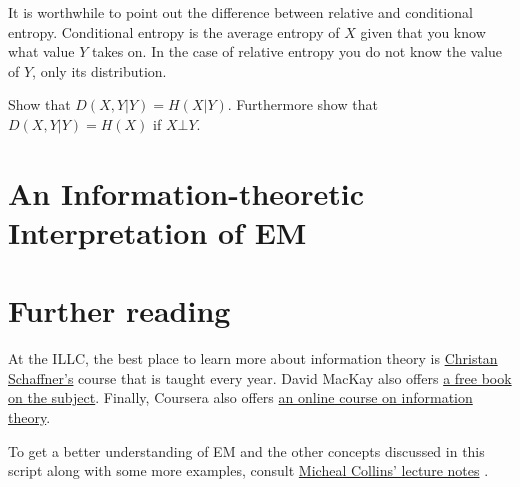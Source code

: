 It is worthwhile to point out the difference between relative and conditional entropy. Conditional entropy is the average entropy of $ X $ given that you
know what value $ Y $ takes on. In the case of relative entropy you do not know the value of $ Y $, only its distribution.

\begin{Exercise}
 Show that $ D(X,Y|Y) = H(X|Y) $. Furthermore show that $ D(X,Y|Y) = H(X) $ if $ X\bot Y $.
\end{Exercise}

\section{An Information-theoretic Interpretation of EM}

\section*{Further reading}

At the ILLC, the best place to learn more about information theory is \href{http://homepages.cwi.nl/~schaffne/courses/inftheory/2015/}{Christan Schaffner's}
course that is taught every year. David MacKay also offers \href{http://www.inference.phy.cam.ac.uk/itprnn/book.pdf}{a free book on the subject}. Finally,
Coursera also offers \href{https://www.coursera.org/course/informationtheory}{an online course on information theory}.

To get a better understanding of EM and the other concepts discussed in this script along with some more examples, consult 
\href{http://www.cs.columbia.edu/~mcollins/em.pdf}{Micheal Collins' lecture notes} .

